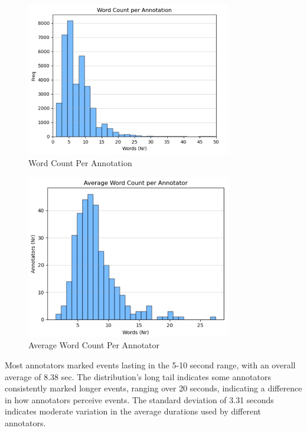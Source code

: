 \documentclass{article}
\begin{document}
\begin{figure}[H]
  \centering
  \includegraphics[width=0.8\textwidth]{figures/annotation_quality/word_count_per_annotation.png}
  \caption{Word Count Per Annotation}
  \label{fig:word_count}
\end{figure}

\begin{figure}[H]
  \centering
  \includegraphics[width=0.8\textwidth]{figures/annotation_quality/average_word_count_per_annotator.png}
  \caption{Average Word Count Per Annotator}
  \label{fig:avg_word_count}
\end{figure}

Most annotators marked events lasting in the 5-10 second range, with an overall average of 8.38 sec. The distribution's long tail indicates some annotators consistently marked longer events, ranging over 20 seconds, indicating a difference in how annotators perceive events. The standard deviation of 3.31 seconds indicates moderate variation in the average durations used by different annotators.
\end{document}
